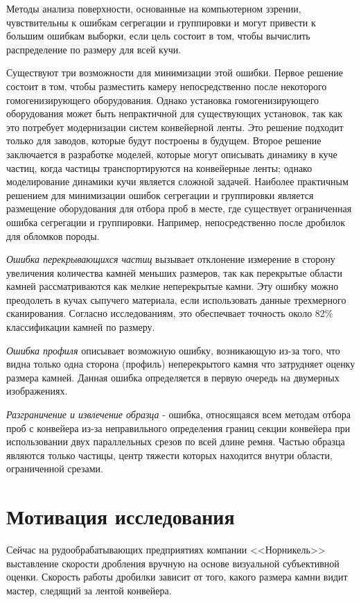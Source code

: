 \documentclass[specification,annotation,times]{itmo-student-thesis}
\begin{document}
Методы анализа поверхности, основанные на компьютерном ззрении, чувствительны к ошибкам сегрегации и группировки и могут привести к большим ошибкам выборки, если цель состоит в том, чтобы вычислить распределение по размеру для всей кучи. 

Существуют три возможности для минимизации этой ошибки. Первое решение состоит в том, чтобы разместить камеру непосредственно после некоторого гомогенизирующего оборудования. Однако установка гомогенизирующего оборудования может быть непрактичной для существующих установок, так как это потребует модернизации систем конвейерной ленты. Это решение подходит только для заводов, которые будут построены в будущем. Второе решение заключается в разработке моделей, которые могут описывать динамику в куче частиц, когда частицы транспортируются на конвейерные ленты; однако моделирование динамики кучи является сложной задачей. Наиболее практичным решением для минимизации ошибок сегрегации и группировки является размещение оборудования для отбора проб в месте, где существует ограниченная ошибка сегрегации и группировки. Например, непосредственно после дробилок для обломков породы.

\textit{Ошибка перекрывающихся частиц} вызывает отклонение измерение в сторону увеличения количества камней меньших размеров, так как перекрытые области камней рассматриваются как мелкие неперекрытые камни. Эту ошибку можно преодолеть в кучах сыпучего материала, если использовать данные трехмерного сканирования. Согласно исследованиям, это обеспечвает  точность около 82\% классификации камней по размеру.

\textit{Ошибка профиля} описывает возможную ошибку, возникающую из-за того,  что видна только одна сторона (профиль) неперекрытого камня что затрудняет оценку размера камней. Данная ошибка определяется в первую очередь на двумерных изображениях.

\textit{Разграничение и извлечение образца} - ошибка, относящаяся всем методам отбора проб с конвейера из-за неправильного определения границ секции конвейера при использовании двух параллельных срезов по всей длине ремня. Частью образца являются только частицы, центр тяжести которых находится внутри области, ограниченной срезами.

\section{Мотивация исследования}
Сейчас на рудообрабатывающих предприятиях компании <<Норникель>> выставление скорости дробления вручную на основе визуальной субъективной оценки. Скорость работы дробилки зависит от того, какого размера камни видит мастер, следящий за лентой конвейера. 
\end{document}
